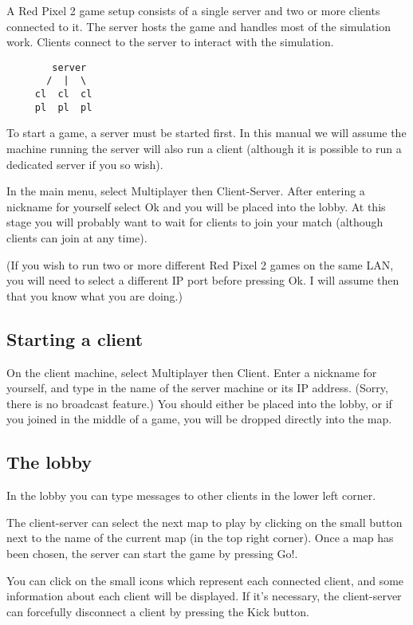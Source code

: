 \documentclass[a4paper,titlepage]{article}
\begin{document}
A Red Pixel 2 game setup consists of a single server and two or more
clients connected to it.  The server hosts the game and handles most
of the simulation work.  Clients connect to the server to interact
with the simulation.

\begin{verbatim}
        server
       /  |  \
     cl  cl  cl
     pl  pl  pl
\end{verbatim}

To start a game, a server must be started first.  In this manual we
will assume the machine running the server will also run a client
(although it is possible to run a dedicated server if you so wish).

In the main menu, select \textsf{Multiplayer} then
\textsf{Client-Server}.  After entering a nickname for yourself select
\textsf{Ok} and you will be placed into the lobby.  At this stage you
will probably want to wait for clients to join your match (although
clients can join at any time).

(If you wish to run two or more different Red Pixel 2 games on the
same LAN, you will need to select a different IP port before pressing
\textsf{Ok}.  I will assume then that you know what you are doing.)


\subsection{Starting a client}

On the client machine, select \textsf{Multiplayer} then
\textsf{Client}.  Enter a nickname for yourself, and type in the name
of the server machine or its IP address.  (Sorry, there is no
broadcast feature.)  You should either be placed into the lobby, or if
you joined in the middle of a game, you will be dropped directly into
the map.


\subsection{The lobby}

In the lobby you can type messages to other clients in the lower left
corner.

The client-server can select the next map to play by clicking on the
small button next to the name of the current map (in the top right
corner).  Once a map has been chosen, the server can start the game by
pressing \textsf{Go!}.

You can click on the small icons which represent each connected
client, and some information about each client will be displayed.  If
it's necessary, the client-server can forcefully disconnect a client
by pressing the \textsf{Kick} button.
\end{document}
